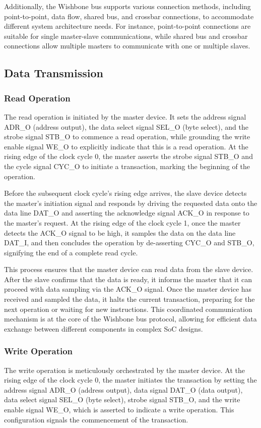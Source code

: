 \documentclass[conference]{IEEEtran}
\begin{document}
Additionally, the Wishbone bus supports various connection methods, including point-to-point, data flow, shared bus, and crossbar connections, to accommodate different system architecture needs. For instance, point-to-point connections are suitable for single master-slave communications, while shared bus and crossbar connections allow multiple masters to communicate with one or multiple slaves.

\subsection{Data Transmission}
\subsubsection{Read Operation}
The read operation is initiated by the master device. It sets the address signal ADR\_O (address output), the data select signal SEL\_O (byte select), and the strobe signal STB\_O to commence a read operation, while grounding the write enable signal WE\_O to explicitly indicate that this is a read operation. At the rising edge of the clock cycle 0, the master asserts the strobe signal STB\_O and the cycle signal CYC\_O to initiate a transaction, marking the beginning of the operation.

Before the subsequent clock cycle's rising edge arrives, the slave device detects the master's initiation signal and responds by driving the requested data onto the data line DAT\_O and asserting the acknowledge signal ACK\_O in response to the master's request. At the rising edge of the clock cycle 1, once the master detects the ACK\_O signal to be high, it samples the data on the data line DAT\_I, and then concludes the operation by de-asserting CYC\_O and STB\_O, signifying the end of a complete read cycle.

This process ensures that the master device can read data from the slave device. After the slave confirms that the data is ready, it informs the master that it can proceed with data sampling via the ACK\_O signal. Once the master device has received and sampled the data, it halts the current transaction, preparing for the next operation or waiting for new instructions. This coordinated communication mechanism is at the core of the Wishbone bus protocol, allowing for efficient data exchange between different components in complex SoC designs.

\subsubsection{Write Operation}
The write operation is meticulously orchestrated by the master device. At the rising edge of the clock cycle 0, the master initiates the transaction by setting the address signal ADR\_O (address output), data signal DAT\_O (data output), data select signal SEL\_O (byte select), strobe signal STB\_O, and the write enable signal WE\_O, which is asserted to indicate a write operation. This configuration signals the commencement of the transaction.
\end{document}
